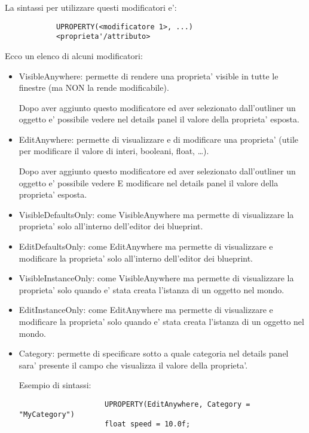         La sintassi per utilizzare questi modificatori e':
        \begin{lstlisting}
            UPROPERTY(<modificatore 1>, ...)
            <proprieta'/attributo>
        \end{lstlisting}

        Ecco un elenco di alcuni modificatori:
        \begin{itemize}
            \item VisibleAnywhere: permette di rendere una proprieta' visible in tutte le finestre (ma NON la rende modificabile).

                Dopo aver aggiunto questo modificatore ed aver selezionato dall'outliner un oggetto e' possibile vedere nel details panel il valore della proprieta' esposta.

            \item EditAnywhere: permette di visualizzare e di modificare una proprieta' (utile per modificare il valore di interi, booleani, float, \dots).

                Dopo aver aggiunto questo modificatore ed aver selezionato dall'outliner un oggetto e' possibile vedere E modificare nel details panel il valore della proprieta' esposta.

            \item VisibleDefaultsOnly: come VisibleAnywhere ma permette di visualizzare la proprieta' solo all'interno dell'editor dei blueprint.
            \item EditDefaultsOnly: come EditAnywhere ma permette di visualizzare e modificare la proprieta' solo all'interno dell'editor dei blueprint.
            \item VisibleInstanceOnly: come VisibleAnywhere ma permette di visualizzare la proprieta' solo quando e' stata creata l'istanza di un oggetto nel mondo.
            \item EditInstanceOnly: come EditAnywhere ma permette di visualizzare e modificare la proprieta' solo quando e' stata creata l'istanza di un oggetto nel mondo.
            \item Category: permette di specificare sotto a quale categoria nel details panel sara' presente il campo che visualizza il valore della proprieta'.

                Esempio di sintassi:
                \begin{verbatim}
                    UPROPERTY(EditAnywhere, Category = "MyCategory")
                    float speed = 10.0f;
                \end{verbatim}


\end{itemize}

